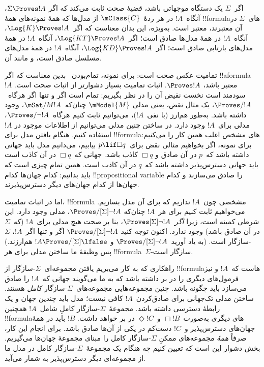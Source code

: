 \documentclass[../../../include/open-logic-section]{subfiles}
\begin{document}


اگر~$\Sigma$ یک دستگاه موجهاتی باشد، قضیهٔ صحت ثابت می‌کند که اگر
$\Sigma \Proves !A$، آنگاه~$!A$ در هر ردهٔ~$\mClass{C}$ از مدل‌ها که
همهٔ نمونه‌های همهٔ !!{formula}های~$\Sigma$ در آن معتبرند، معتبر است.
به‌ویژه، این بدان معناست که اگر~$\Log{K} \Proves !A$، آنگاه~$!A$ در
همهٔ مدل‌ها صادق است؛ اگر~$\Log{KT} \Proves !A$، آنگاه~$!A$ در همهٔ
مدل‌های بازتابی صادق است؛ اگر~$\Log{KD} \Proves !A$، آنگاه~$!A$ در
همهٔ مدل‌های مسلسل صادق است، و مانند آن.

تمامیت عکس صحت است: برای نمونه، تمام‌بودن~ بدین معناست که اگر
!!a{formula}~$!A$ معتبر باشد، $\Proves !A$. اثبات تمامیت بسیار دشوارتر
از اثبات صحت است. سودمند است نخست نقیض آن را در نظر بگیریم: 
تمام است اگر و تنها اگر هرگاه~$\Proves/ !A$، یک مثال نقض، یعنی مدلی
$\mModel{M}$ چنان‌که~$\mSat/{M}{!A}$، وجود داشته باشد. به‌طور هم‌ارز
(با نفی~$!A$)، می‌توانیم ثابت کنیم هرگاه~$\Proves/ \lnot !A$، مدلی
برای~$!A$ وجود دارد. در ساختن چنین مدلی می‌توانیم از اطلاعات موجود در
$!A$ استفاده کنیم. هنگام یافتن مدل برای !!{formula}های مشخص اغلب همین
کار را می‌کنیم: برای نمونه، اگر بخواهیم مثالی نقض برای~$p \lif \Box q$
بیابیم، می‌دانیم مدل باید جهانی داشته باشد که~$p$ در آن صادق و
$\Box q$ کاذب باشد. جهانی که~$\Box q$ در آن کاذب است باید جهانی
دسترس‌پذیر داشته باشد که~$q$ در آن کاذب است. همین تمام چیزی است که
باید بدانیم: کدام جهان‌ها کدام !!{propositional variable} را صادق
می‌سازند و کدام جهان‌ها از کدام جهان‌های دیگر دسترس‌پذیرند.

اما در اثبات تمامیت، !!{formula} مشخصی چون~$!A$ نداریم که برای آن مدل
بسازیم. می‌خواهیم ثابت کنیم برای هر~$!A$ چنان‌که
$\Proves/[\Sigma] \lnot !A$، مدلی وجود دارد. این شرطی کمینه است، زیرا
\emph{اگر}~$\Proves[\Sigma] \lnot !A$، بنا بر صحت هیچ مدلی برای~$!A$
(که~$\Sigma$ در آن صادق باشد) وجود ندارد. اکنون توجه کنید
$\Proves/[\Sigma] \lnot !A$ اگر و تنها اگر~$!A$، $\Sigma$-سازگار است.
(به یاد آورید~$\Proves/[\Sigma] \lnot !A$ و
$!A \Proves/[\Sigma] \lfalse$ هم‌ارزند.) پس وظیفهٔ ما ساختن مدلی برای
هر !!{formula}~$\Sigma$-سازگار است.

راهکاری که به کار می‌بریم یافتن مجموعه‌ای~$\Sigma$-سازگار از
!!{formula}هاست که~$!A$ و نیز فرمول‌های دیگری را در بر داشته باشد که
به ما می‌گویند جهانی که~$!A$ را صادق می‌سازد باید چگونه باشد. چنین
مجموعه‌هایی مجموعه‌های~$\Sigma$-سازگار \emph{کامل} هستند. ساختن مدلی
تک‌جهانی برای صادق‌کردن~$!A$ کافی نیست؛ مدل باید چندین جهان و یک رابطهٔ
دسترسی داشته باشد. مجموعهٔ~$\Sigma$-سازگار کاملِ شامل~$!A$ همچنین
!!{formula}های دیگری به‌صورت~$\Box !B$ و~$\Diamond !C$ در بر خواهد
داشت. $!B$ باید در همهٔ جهان‌های دسترس‌پذیر و~$!C$ دست‌کم در یکی از
آن‌ها صادق باشد. برای انجام این کار، صرفاً \emph{همهٔ} مجموعه‌های ممکنِ
$\Sigma$-سازگار کامل را مبنای مجموعهٔ جهان‌ها می‌گیریم. بخش دشوار این
است که تعیین کنیم چه هنگام یک مجموعهٔ~$\Sigma$-سازگار کامل در مدل ما
از مجموعه‌ای دیگر دسترس‌پذیر به شمار می‌آید.
\end{document}

